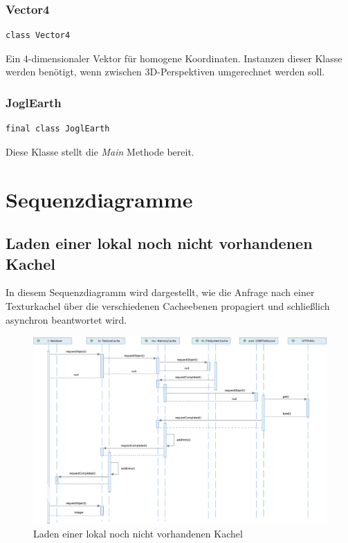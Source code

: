 \documentclass[10pt]{scrreprt}
\begin{document}
\subsection*{Vector4}
\begin{lstlisting}
class Vector4
\end{lstlisting}
Ein 4-dimensionaler Vektor für homogene Koordinaten. Instanzen dieser Klasse werden benötigt, wenn zwischen 3D-Perspektiven umgerechnet werden soll.\\



\subsection*{JoglEarth}
\begin{lstlisting}
final class JoglEarth
\end{lstlisting}
Diese Klasse stellt die \textit{Main} Methode bereit.\\




\chapter{Sequenzdiagramme}

\section{Laden einer lokal noch nicht vorhandenen Kachel}
In diesem Sequenzdiagramm wird dargestellt, wie die Anfrage nach einer Texturkachel über die verschiedenen Cacheebenen propagiert und schließlich asynchron beantwortet wird.\\


\begin{figure}
\begin{centering}
\includegraphics[scale=0.57,angle=90,origin=c]{Ablaufdiagramm.eps}
\caption{Laden einer lokal noch nicht vorhandenen Kachel}
\end{centering}
\end{figure}
\end{document}
